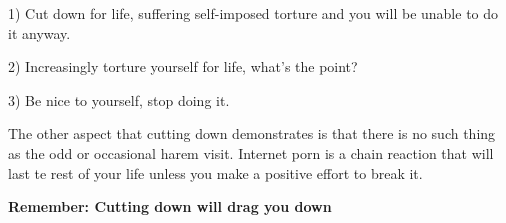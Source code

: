   1) Cut down for life, suffering self-imposed torture and you will be unable to do it anyway.

  2) Increasingly torture yourself for life, what's the point?

  3) Be nice to yourself, stop doing it.

The other aspect that cutting down demonstrates is that there is no such thing as the odd or occasional harem visit. Internet porn is a chain reaction that will last te rest of your life unless you make a positive effort to break it.

\textbf{Remember: Cutting down will drag you down}
